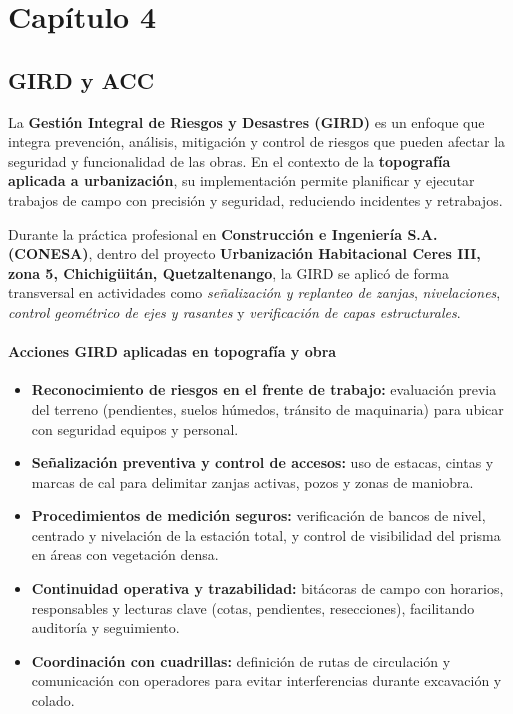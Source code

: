 \documentclass[12pt]{article}
\let\oldsection\section
\renewcommand{\section}{\clearpage\oldsection}
\begin{document}
	
	
	
	\section{Capítulo 4 }
	
	\subsection{GIRD y ACC}
	
	La \textbf{Gestión Integral de Riesgos y Desastres (GIRD)} es un enfoque que integra prevención, análisis, mitigación y control de riesgos que pueden afectar la seguridad y funcionalidad de las obras. En el contexto de la \textbf{topografía aplicada a urbanización}, su implementación permite planificar y ejecutar trabajos de campo con precisión y seguridad, reduciendo incidentes y retrabajos.
	
	Durante la práctica profesional en \textbf{Construcción e Ingeniería S.A. (CONESA)}, dentro del proyecto \textbf{Urbanización Habitacional Ceres III, zona 5, Chichigüitán, Quetzaltenango}, la GIRD se aplicó de forma transversal en actividades como \emph{señalización y replanteo de zanjas}, \emph{nivelaciones}, \emph{control geométrico de ejes y rasantes} y \emph{verificación de capas estructurales}.
	
	\paragraph{Acciones GIRD aplicadas en topografía y obra}
	\begin{itemize}
		\item \textbf{Reconocimiento de riesgos en el frente de trabajo:} evaluación previa del terreno (pendientes, suelos húmedos, tránsito de maquinaria) para ubicar con seguridad equipos y personal.
		\item \textbf{Señalización preventiva y control de accesos:} uso de estacas, cintas y marcas de cal para delimitar zanjas activas, pozos y zonas de maniobra.
		\item \textbf{Procedimientos de medición seguros:} verificación de bancos de nivel, centrado y nivelación de la estación total, y control de visibilidad del prisma en áreas con vegetación densa.
		\item \textbf{Continuidad operativa y trazabilidad:} bitácoras de campo con horarios, responsables y lecturas clave (cotas, pendientes, resecciones), facilitando auditoría y seguimiento.
		\item \textbf{Coordinación con cuadrillas:} definición de rutas de circulación y comunicación con operadores para evitar interferencias durante excavación y colado.
	\end{itemize}
	
\end{document}
